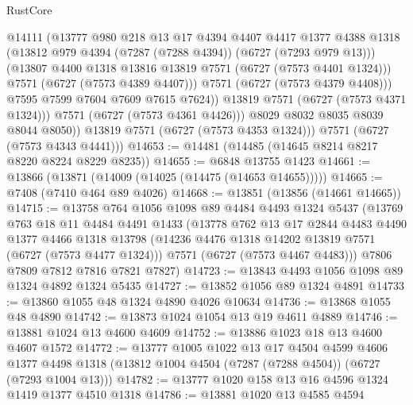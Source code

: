 \begin{lexlean}{RustCore}
\begin{coremodule}
                      @14111
                      (@13777
                        @980
                        @218
                        @13
                        @17
                        @4394
                        @4407
                        @4417
                        @1377
                        @4388
                        @1318
                        (@13812 @979 @4394 (@7287 (@7288 @4394)) (@6727 (@7293 @979 @13)))
                        (@13807 @4400 @1318 @13816 @13819 @7571 (@6727 (@7573 @4401 @1324)))
                        @7571
                        (@6727 (@7573 @4389 @4407)))
                      @7571
                      (@6727 (@7573 @4379 @4408)))
                    @7595
                    @7599
                    @7604
                    @7609
                    @7615
                    @7624))
                @13819
                @7571
                (@6727 (@7573 @4371 @1324)))
              @7571
              (@6727 (@7573 @4361 @4426)))
            @8029
            @8032
            @8035
            @8039
            @8044
            @8050))
        @13819
        @7571
        (@6727 (@7573 @4353 @1324)))
      @7571
      (@6727 (@7573 @4343 @4441)))
@14653 := @14481 (@14485 (@14645 @8214 @8217 @8220 @8224 @8229 @8235))
@14655 := @6848 @13755 @1423
@14661 := @13866 (@13871 (@14009 (@14025 (@14475 (@14653 @14655)))))
@14665 := @7408 (@7410 @464 @89 @4026)
@14668 := @13851 (@13856 (@14661 @14665))
@14715 := @13758
    @764
    @1056
    @1098
    @89
    @4484
    @4493
    @1324
    @5437
    (@13769
      @763
      @18
      @11
      @4484
      @4491
      @1433
      (@13778
        @762
        @13
        @17
        @2844
        @4483
        @4490
        @1377
        @4466
        @1318
        @13798
        (@14236 @4476 @1318 @14202 @13819 @7571 (@6727 (@7573 @4477 @1324)))
        @7571
        (@6727 (@7573 @4467 @4483)))
      @7806
      @7809
      @7812
      @7816
      @7821
      @7827)
@14723 := @13843 @4493 @1056 @1098 @89 @1324 @4892 @1324 @5435
@14727 := @13852 @1056 @89 @1324 @4891
@14733 := @13860 @1055 @48 @1324 @4890 @4026 @10634
@14736 := @13868 @1055 @48 @4890
@14742 := @13873 @1024 @1054 @13 @19 @4611 @4889
@14746 := @13881 @1024 @13 @4600 @4609
@14752 := @13886 @1023 @18 @13 @4600 @4607 @1572
@14772 := @13777
    @1005
    @1022
    @13
    @17
    @4504
    @4599
    @4606
    @1377
    @4498
    @1318
    (@13812 @1004 @4504 (@7287 (@7288 @4504)) (@6727 (@7293 @1004 @13)))
@14782 := @13777 @1020 @158 @13 @16 @4596 @1324 @1419 @1377 @4510 @1318
@14786 := @13881 @1020 @13 @4585 @4594

\end{coremodule}
\end{lexlean}
